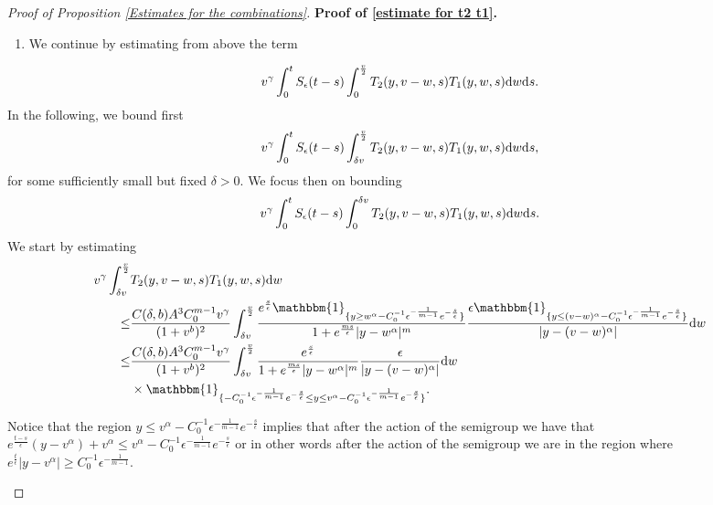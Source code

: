 \documentclass[11pt]{article}
\numberwithin{equation}{section}
\newcommand{\der}{\textup{d}}
\begin{document}
\begin{proof}[Proof of Proposition \ref{Estimates for the combinations}]
\textbf{Proof of \eqref{estimate for t2 t1}.} 
\begin{enumerate}
    \item[i)] We continue by estimating from above the term 
\end{enumerate}
\begin{align}\label{semigroup t2 t1}
    v^{\gamma}\int_{0}^{t}S_{\epsilon}(t-s)\int_{0}^{\frac{v}{2}} T_{2}(y,v-w,s)T_{1}(y,w,s)\der w\der s.
\end{align}
In the following, we bound first
  \begin{align}\label{obs on the region}
     v^{\gamma}\int_{0}^{t}S_{\epsilon}(t-s)\int_{\delta v}^{\frac{v}{2}} T_{2}(y,v-w,s)T_{1}(y,w,s)\der w\der s,
  \end{align}
  for some sufficiently small but fixed $\delta>0$. We focus then on bounding
 \begin{align*}
     v^{\gamma}\int_{0}^{t}S_{\epsilon}(t-s)\int_{0}^{\delta v}  T_{2}(y,v-w,s)T_{1}(y,w,s)\der w\der s.
  \end{align*}
We start by estimating
\begin{align*}
    v^{\gamma}\int_{\delta v}^{\frac{v}{2}} & T_{2}(y,v-w,s)T_{1}(y,w,s)\der w\\
       \leq &\frac{C(\delta, b)A^{3} C_{0}^{m-1}v^{\gamma}}{(1+v^{b})^{2}}\int_{\delta v}^{\frac{v}{2}}\frac{e^{\frac{s}{\epsilon}}\mathbbm{1}_{\{y\geq w^{\alpha}-C_{0}^{-1}\epsilon^{-\frac{1}{m-1}}e^{-\frac{s}{\epsilon}}\}}}{1+e^{\frac{ms}{\epsilon}}|y-w^{\alpha}|^{m}}\frac{\epsilon\mathbbm{1}_{\{y\leq (v-w)^{\alpha}-C_{0}^{-1}\epsilon^{-\frac{1}{m-1}}e^{-\frac{s}{\epsilon}}\}}}{|y-(v-w)^{\alpha}|}\der w\\
    \leq & \frac{C(\delta, b)A^{3}C_{0}^{m-1} v^{\gamma}}{(1+v^{b})^{2}}\int_{\delta v}^{\frac{v}{2}}\frac{e^{\frac{s}{\epsilon}}}{1+e^{\frac{ms}{\epsilon}}|y-w^{\alpha}|^{m}}\frac{\epsilon}{|y-(v-w)^{\alpha}|}\der w\\
   & \times \mathbbm{1}_{\{-C_{0}^{-1}\epsilon^{-\frac{1}{m-1}}e^{-\frac{s}{\epsilon}}\leq y\leq v^{\alpha}-C_{0}^{-1}\epsilon^{-\frac{1}{m-1}}e^{-\frac{s}{\epsilon}}\}}.
\end{align*}
\begin{rmk}\label{remark nice region}
Notice that the region $y\leq v^{\alpha}-C_{0}^{-1}\epsilon^{-\frac{1}{m-1}}e^{-\frac{s}{\epsilon}}$ implies that after the action of the semigroup we have that $e^{\frac{t-s}{\epsilon}}(y-v^{\alpha})+v^{\alpha}\leq v^{\alpha}-C_{0}^{-1}\epsilon^{-\frac{1}{m-1}}e^{-\frac{s}{\epsilon}}$ or in other words after the action of the semigroup we are in the region where $ e^{\frac{t}{\epsilon}}|y-v^{\alpha}|\geq C_{0}^{-1}\epsilon^{-\frac{1}{m-1}}$. 

\end{rmk}
\end{proof}
\end{document}

